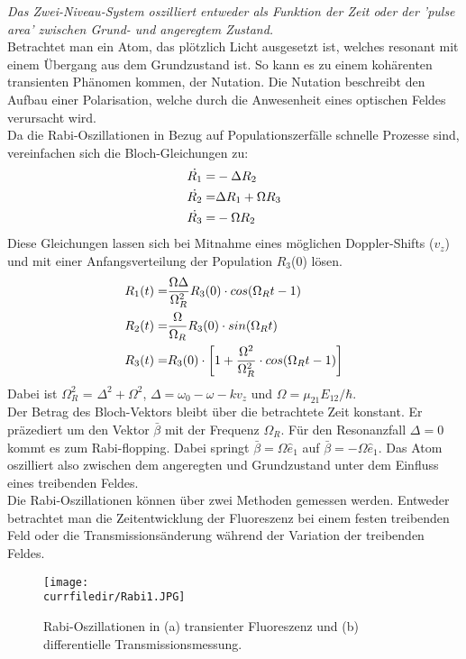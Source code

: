 \textit{Das Zwei-Niveau-System oszilliert entweder als Funktion der
Zeit oder der 'pulse area' zwischen Grund- und angeregtem
Zustand.}\\
Betrachtet man ein Atom, das plötzlich Licht ausgesetzt ist, welches resonant mit einem Übergang aus dem Grundzustand ist. So kann es zu einem kohärenten transienten Phänomen kommen, der Nutation. Die Nutation beschreibt den Aufbau einer Polarisation, welche durch die Anwesenheit eines optischen Feldes verursacht wird.\\
Da die Rabi-Oszillationen in Bezug auf Populationszerfälle schnelle Prozesse sind, vereinfachen sich die Bloch-Gleichungen zu:
\begin{align}
    \dot{R_1} =& -\Delta R_2  \notag \\
    \dot{R_2} =& \Delta R_1 + \Omega R_3 \label{Rabi}\\
    \dot{R_3} =& - \Omega R_2 \notag
 \end{align}
Diese Gleichungen lassen sich bei Mitnahme eines möglichen Doppler-Shifts ($v_z$) und mit einer Anfangsverteilung der Population $R_3$(0) lösen.
\begin{align}
    R_1(t) =& \frac{\Omega \Delta}{\Omega_R^2}R_3(0)\cdot cos(\Omega_Rt-1) \notag \\
    R_2(t) =& \frac{\Omega}{\Omega_R}R_3(0)\cdot sin(\Omega_Rt) \label{Rabi2}\\
    R_3(t) =& R_3(0)\cdot \left[1+\frac{\Omega^2}{\Omega_R^2}\cdot 
    cos(\Omega_Rt-1)\right] \notag
\end{align}
Dabei ist $\Omega_R^2$ = $\Delta^2 + \Omega^2$, $\Delta = \omega_0-\omega-kv_z$ und $\Omega = \mu_{21}E_{12}/\hbar$.\\
Der Betrag des Bloch-Vektors bleibt über die betrachtete Zeit konstant. Er präzediert um den Vektor $\bar{\beta}$ mit der Frequenz $\Omega_R$.
Für den Resonanzfall $\Delta = 0$ kommt es zum Rabi-flopping. Dabei springt  $\bar{\beta} = \Omega \hat{e}_1$ auf $\bar{\beta} = -\Omega \hat{e}_1$. Das Atom oszilliert also zwischen dem angeregten und Grundzustand unter dem Einfluss eines treibenden Feldes.\\
Die Rabi-Oszillationen können über zwei Methoden gemessen werden. Entweder betrachtet man die Zeitentwicklung der Fluoreszenz bei einem festen treibenden Feld oder die Transmissionsänderung während der Variation der treibenden Feldes.
\begin{figure} [h]
    \centering
    \texttt{[image: \\currfiledir/Rabi1.JPG]}
    \caption{Rabi-Oszillationen in (a) transienter Fluoreszenz und (b) differentielle Transmissionsmessung.}
    \label{fig:Rabi}
\end{figure}

